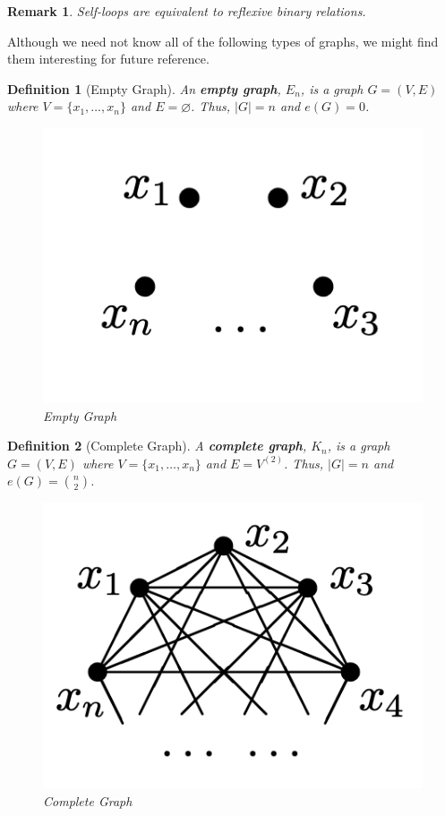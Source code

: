 \documentclass[cm,linguex]{glossa}
\theoremstyle{defn}
\newtheorem{defn}{Definition}
\theoremstyle{axiom}
\theoremstyle{thm}
\theoremstyle{lem}
\theoremstyle{cor}
\theoremstyle{prop}
\theoremstyle{rmk}
\newtheorem*{rmk}{Remark}
\begin{document}
\begin{rmk}
Self-loops are equivalent to reflexive binary relations.
\end{rmk}

Although we need not know all of the following types of graphs, we might
find them interesting for future reference.

\begin{defn}[Empty Graph]
An \textbf{empty graph}, $E_n$, is a graph $G = (V, E)$ where $V = \{x_1, \dots, x_n\}$ and $E = \varnothing$. Thus, $\lvert G \rvert = n$ and $e(G)= 0$.

\begin{figure}[H]
\centering
\includegraphics[scale=0.4]{fig/2.png}
\caption{Empty Graph}
\end{figure}
\end{defn}

\begin{defn}[Complete Graph]
A \textbf{complete graph}, $K_n$, is a graph $G = (V, E)$ where $V = \{x_1, \dots, x_n\}$ and $E = V^{(2)}$. Thus, $\lvert G \rvert = n$ and $\displaystyle e(G)= \binom{n}{2}$.

\begin{figure}[H]
\centering
\includegraphics[scale=0.4]{fig/3.png}
\caption{Complete Graph}
\end{figure}
\end{defn}
\end{document}
